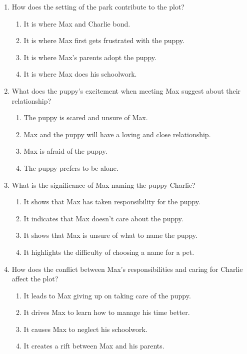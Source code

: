 \documentclass[12pt]{article}
\begin{document}
\begin{enumerate}
    \item How does the setting of the park contribute to the plot?
    \begin{enumerate}[label=\Alph*.]
        \item It is where Max and Charlie bond.
        \item It is where Max first gets frustrated with the puppy.
        \item It is where Max’s parents adopt the puppy.
        \item It is where Max does his schoolwork.
    \end{enumerate}
    \vspace{0.5cm}

    \item What does the puppy's excitement when meeting Max suggest about their relationship?
    \begin{enumerate}[label=\Alph*.]
        \item The puppy is scared and unsure of Max.
        \item Max and the puppy will have a loving and close relationship.
        \item Max is afraid of the puppy.
        \item The puppy prefers to be alone.
    \end{enumerate}
    \vspace{0.5cm}

    \item What is the significance of Max naming the puppy Charlie?
    \begin{enumerate}[label=\Alph*.]
        \item It shows that Max has taken responsibility for the puppy.
        \item It indicates that Max doesn’t care about the puppy.
        \item It shows that Max is unsure of what to name the puppy.
        \item It highlights the difficulty of choosing a name for a pet.
    \end{enumerate}
    \vspace{0.5cm}

    \item How does the conflict between Max's responsibilities and caring for Charlie affect the plot?
    \begin{enumerate}[label=\Alph*.]
        \item It leads to Max giving up on taking care of the puppy.
        \item It drives Max to learn how to manage his time better.
        \item It causes Max to neglect his schoolwork.
        \item It creates a rift between Max and his parents.
    \end{enumerate}
    \vspace{0.5cm}


\end{enumerate}
\end{document}
